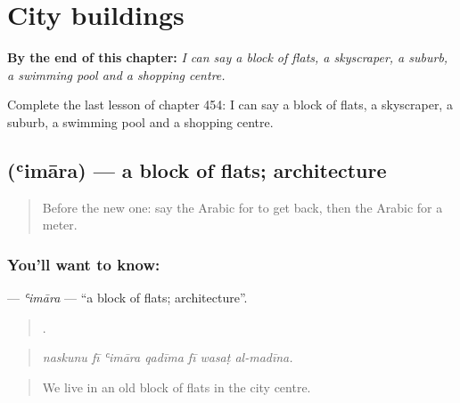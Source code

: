 
\chapter{City buildings}
\label{ch:ar-city-buildings}

\begin{chapteropening}
\textbf{By the end of this chapter:} \emph{I can say a block of flats, a skyscraper, a suburb, a swimming pool and a shopping centre.}

Complete the last lesson of chapter 454: I can say a block of flats, a skyscraper, a suburb, a swimming pool and a shopping centre.
\end{chapteropening}

\section[\texorpdfstring{\ar{عمارة} (ʿimāra)}{عمارة (ʿimāra)}]{ (ʿimāra) — a block of flats; architecture}

\label{lesson:AR-C454-imara}



\begin{quote}
Before the new one: say the Arabic for to get back, then the Arabic for a meter.
\end{quote}

\subsection*{You'll want to know: }
\textbf{} — \emph{ʿimāra} — \textquotedblleft{}a block of flats; architecture\textquotedblright{}.

\begin{quote}
      .
\end{quote}

\begin{quote}
\emph{naskunu fī ʿimāra qadīma fī wasaṭ al-madīna.}
\end{quote}

\begin{quote}
We live in an old block of flats in the city centre.
\end{quote}

